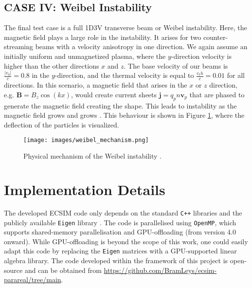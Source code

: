 \subsection{CASE IV: Weibel Instability}
The final test case is a full 1D3V transverse beam or Weibel instability. Here, the magnetic field plays a large role in the instability. It arises for two counter-streaming beams with a velocity anisotropy in one direction. We again assume an initially uniform and unmagnetized plasma, where the $y$-direction velocity is higher than the other directions $x$ and $z$. The base velocity of our beams is $\frac{|v_0|}{c} = 0.8$ in the $y$-direction, and the thermal velocity is equal to $\frac{v_th}{c} = 0.01$ for all directions. In this scenario, a magnetic field that arises in the $x$ or $z$ direction, e.g. $\textbf{B} = B_z \cos(k x)$,  would create current sheets $\textbf{j} = q_p n \textbf{v}_p$ that are phased to generate the magnetic field creating the shape. This leads to instability as the magnetic field grows and grows \cite{chen_introduction_1984}. This behaviour is shown in Figure \ref{fig: weibel instability}, where the deflection of the particles is visualized.
\begin{figure}
    \centering
    \texttt{[image: images/weibel\_mechanism.png]}
    \caption{Physical mechanism of the Weibel instability \cite{chen_introduction_1984}.}
    \label{fig: weibel instability}
\end{figure}


\section{Implementation Details}
The developed ECSIM code only depends on the standard \texttt{C++} libraries and the publicly available \texttt{Eigen} library \cite{gael_guennebaud_and_benoit_jacob_and_others_eigen_2010}. The code is parallelised using \texttt{OpenMP}, which supports shared-memory parallelisation and GPU-offloading (from version  4.0 onward). While GPU-offloading is beyond the scope of this work, one could easily adapt this code by replacing the \texttt{Eigen} matrices with a GPU-supported linear algebra library. The code developed within the framework of this project is open-source and can be obtained from \url{https://github.com/BramLeys/ecsim-parareal/tree/main}. 

